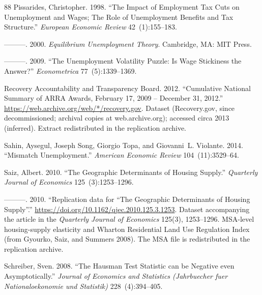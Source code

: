 \documentclass[12pt]{article}
\newcommand{\1}{\mathbf{1}}
\begin{document}
\begin{thebibliography}{88}
Pissarides, Christopher. 1998.
\newblock \enquote{The Impact of Employment Tax Cuts on Unemployment and Wages; The Role of Unemployment Benefits and Tax Structure.}
\newblock \emph{European Economic Review} 42~(1):155--183.

---{}---{}---. 2000.
\newblock \emph{Equilibrium Unemployment Theory}.
\newblock Cambridge, MA: MIT Press.

---{}---{}---. 2009.
\newblock \enquote{The Unemployment Volatility Puzzle: Is Wage Stickiness the Answer?}
\newblock \emph{Econometrica} 77~(5):1339--1369.

{Recovery Accountability and Transparency Board}. 2012.
\newblock \enquote{Cumulative National Summary of {ARRA} Awards, February 17, 2009 -- December 31, 2012.}
\newblock \urlprefix\url{https://web.archive.org/web/*/recovery.gov}.
\newblock Dataset (Recovery.gov, since decommissioned; archival copies at web.archive.org); accessed circa 2013 (inferred). Extract redistributed in the replication archive.

Sahin, Aysegul, Joseph Song, Giorgio Topa, and Giovanni~L. Violante. 2014.
\newblock \enquote{Mismatch Unemployment.}
\newblock \emph{American Economic Review} 104~(11):3529--64.

Saiz, Albert. 2010{}.
\newblock \enquote{The Geographic Determinants of Housing Supply.}
\newblock \emph{Quarterly Journal of Economics} 125~(3):1253--1296.

---{}---{}---. 2010{}.
\newblock \enquote{Replication data for ``The Geographic Determinants of Housing Supply''.}
\newblock \urlprefix\url{https://doi.org/10.1162/qjec.2010.125.3.1253}.
\newblock Dataset accompanying the article in the \emph{Quarterly Journal of Economics} 125(3), 1253--1296. {MSA}-level housing-supply elasticity and Wharton Residential Land Use Regulation Index (from Gyourko, Saiz, and Summers 2008). The {MSA} file is redistributed in the replication archive.

Schreiber, Sven. 2008.
\newblock \enquote{The Hausman Test Statistic can be Negative even Asymptotically.}
\newblock \emph{Journal of Economics and Statistics (Jahrbuecher fuer Nationaloekonomie und Statistik)} 228~(4):394--405.


\end{thebibliography}
\end{document}
